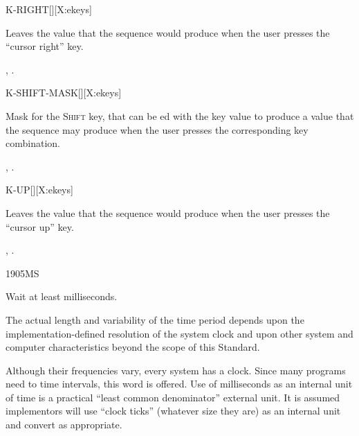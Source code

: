 \begin{worddef}{}{K-RIGHT}[][X:ekeys]
\item {}

	Leaves the value  that the sequence 
	 would produce when the user presses the
	``cursor right'' key.

\see {},
	.
\end{worddef}


\begin{worddef}{}{K-SHIFT-MASK}[][X:ekeys]
\item {}

	Mask for the \textsc{Shift} key, that can be ed with the
	key value to produce a value that the sequence 
	 may produce when the user presses the
	corresponding key combination.

\see {},
	.
\end{worddef}


\begin{worddef}{}{K-UP}[][X:ekeys]
\item {}

	Leaves the value  that the sequence 
	 would produce when the user presses the
	``cursor up'' key.

\see {},
	.
\end{worddef}




\begin{worddef}{1905}{MS}
\item {}

	Wait at least  milliseconds.

\note
	The actual length and variability of the time period depends
	upon the implementation-defined resolution of the system clock
	and upon other system and computer characteristics beyond the
	scope of this Standard.

	\begin{defer}
	\rationale %
		Although their frequencies vary, every system has a clock.
		Since many programs need to time intervals, this word is
		offered. Use of milliseconds as an internal unit of time is
		a practical ``least common denominator'' external unit. It
		is assumed implementors will use ``clock ticks'' (whatever
		size they are) as an internal unit and convert as appropriate.
	\end{defer}
\end{worddef}


